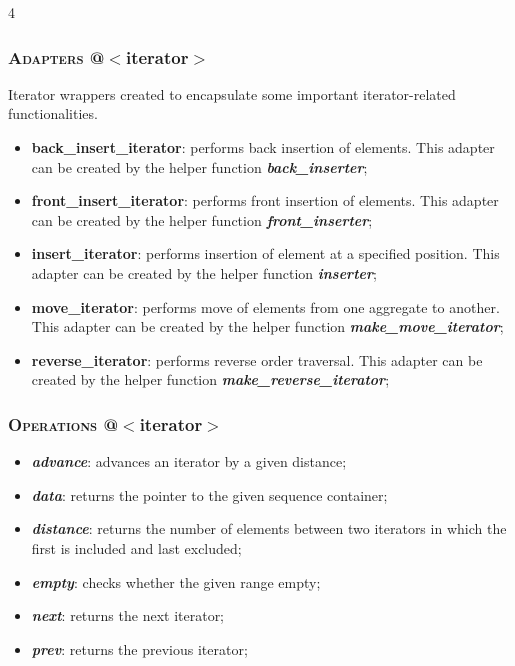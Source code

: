 \documentclass[10pt]{article}
\begin{document}
\begin{multicols*}{4}
{\subsubsection*{\textsc{Adapters} @$<$iterator$>$} 
\noindent
Iterator wrappers created to encapsulate some important iterator-related functionalities. 
\begin{itemize}[leftmargin=*,topsep=0.25pt]
  \setlength\itemsep{-1.8pt}
	\item \textbf{back\_insert\_iterator}: performs back insertion of elements. This adapter can be created by the helper function \emph{\textbf{back\_inserter}};
	\item \textbf{front\_insert\_iterator}: performs front insertion of elements. This adapter can be created by the helper function \emph{\textbf{front\_inserter}};
	\item \textbf{insert\_iterator}: performs insertion of element at a specified position. This adapter can be created by the helper function \emph{\textbf{inserter}};
	\item \textbf{move\_iterator}: performs move of elements from one aggregate to another. This adapter can be created by the helper function \emph{\textbf{make\_move\_iterator}};
	\item \textbf{reverse\_iterator}: performs reverse order traversal. This adapter can be created by the helper function \emph{\textbf{make\_reverse\_iterator}};
\end{itemize}

\subsubsection*{\textsc{Operations} @$<$iterator$>$} 
\begin{itemize}[leftmargin=*,topsep=0.25pt]
  \setlength\itemsep{-1.8pt}
	\item  \emph{\textbf{advance}}: advances an iterator by a given distance;
	\item  \emph{\textbf{data}}: returns the pointer to the given sequence container;
	\item  \emph{\textbf{distance}}: returns the number of elements between two iterators in which the first is included and last excluded;
	\item  \emph{\textbf{empty}}: checks whether the given range empty;
	\item  \emph{\textbf{next}}: returns the next iterator;
	\item  \emph{\textbf{prev}}: returns the previous iterator;
\end{itemize}
}


\end{multicols*}
\end{document}
